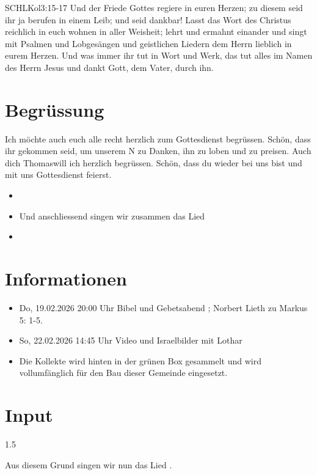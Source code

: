 \documentclass[fontsize=14pt]{mybib}
\newcommand{\Name}{Thomas}
\begin{document}
\begin{bibelbox}{SCHL}{Kol}{3:15-17}
Und der Friede Gottes regiere in euren Herzen; zu diesem seid ihr ja berufen in einem Leib; und seid dankbar! Lasst das Wort des Christus reichlich in euch wohnen in aller Weisheit; lehrt und ermahnt einander und singt mit Psalmen und Lobgesängen und geistlichen Liedern dem Herrn lieblich in eurem Herzen. Und was immer ihr tut in Wort und Werk, das tut alles im Namen des Herrn Jesus und dankt Gott, dem Vater, durch ihn.
\end{bibelbox}
\section{Begrüssung}
Ich möchte auch euch alle recht herzlich zum Gottesdienst begrüssen. Schön, dass ihr gekommen seid, um unserem \herr N zu Danken, ihn zu loben und zu preisen.
Auch dich \Name will ich herzlich begrüssen. Schön, dass du wieder bei uns bist und mit uns Gottesdienst feierst.
\begin{itemize}
    \item[] \beten{} 
    \item[] Und anschliessend singen wir zusammen das Lied
    \item[] 
\end{itemize}

\section{Informationen}
\begin{itemize}
    \item {} Do, 19.02.2026 20:00 Uhr Bibel und Gebetsabend ; Norbert Lieth zu Markus 5: 1-5.
    \item {} So, 22.02.2026 14:45 Uhr Video und Israelbilder mit Lothar
    \item {} Die Kollekte wird hinten in der grünen Box gesammelt und wird vollumfänglich für den Bau dieser Gemeinde eingesetzt.
\end{itemize}

\section{ Input }
\begin{spacing}{1.5}
    

    Aus diesem Grund singen wir nun das Lied 
    .
\end{spacing}
\end{document}
